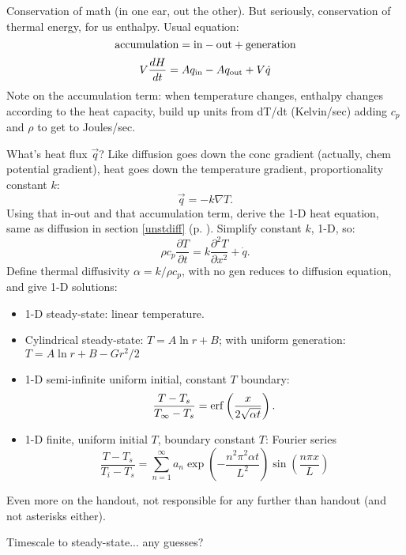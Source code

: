 \documentclass{report}
\begin{document}
Conservation of math (in one ear, out the other).  But
seriously, conservation of thermal energy, for us enthalpy.  Usual equation:
$$\rm accumulation = in - out + generation$$
$$V\frac{dH}{dt} = Aq_{\rm in} - A q_{\rm out} + V\dot{q}$$
Note on the accumulation term: when temperature changes, enthalpy changes
according to the heat capacity, build up units from dT/dt (Kelvin/sec) adding
$c_p$ and $\rho$ to get to Joules/sec.

What's heat flux $\vec{q}$?  Like diffusion goes down the conc gradient
(actually, chem potential gradient), heat goes down the temperature gradient,
proportionality constant $k$:
\begin{equation}
  \label{eq:fouriersfirst}
  \vec{q} = -k \nabla T.
\end{equation}
Using that in-out and that accumulation term, derive the 1-D heat equation,
same as diffusion in section \ref{unstdiff} (p. \pageref{unstdiff}).  Simplify
constant $k$, 1-D, so:
\begin{equation}
  \label{eq:fouriersecond}
  \rho c_p\frac{\partial T}{\partial t} = k \frac{\partial^2T}{\partial x^2} +
  \dot{q}.
\end{equation}
Define thermal diffusivity $\alpha = k/\rho c_p$, with no gen reduces to
diffusion equation, and give 1-D solutions:
\begin{itemize}
\item 1-D steady-state: linear temperature.
\item Cylindrical steady-state: $T=A\ln r +B$; with uniform generation: $T=A\ln
  r+B-Gr^2/2$
\item 1-D semi-infinite uniform initial, constant $T$ boundary:
  \begin{equation}
    \label{eq:erftemp}
    \frac{T-T_s}{T_\infty-T_s} =
    {\rm erf} \left(\frac{x}{2\sqrt{\alpha t}}\right).
  \end{equation}
\item 1-D finite, uniform initial $T$, boundary constant $T$: Fourier series
  \begin{equation}
    \label{eq:fouriertemp}
    \frac{T-T_s}{T_i-T_s} = \sum_{n=1}^\infty a_n
    \exp\left(-\frac{n^2\pi^2\alpha t}{L^2}\right)
    \sin\left(\frac{n\pi x}{L}\right)
  \end{equation}
\end{itemize}
Even more on the handout, not responsible for any further than handout (and not
asterisks either).

\noindent Timescale to steady-state... any guesses?
\end{document}
